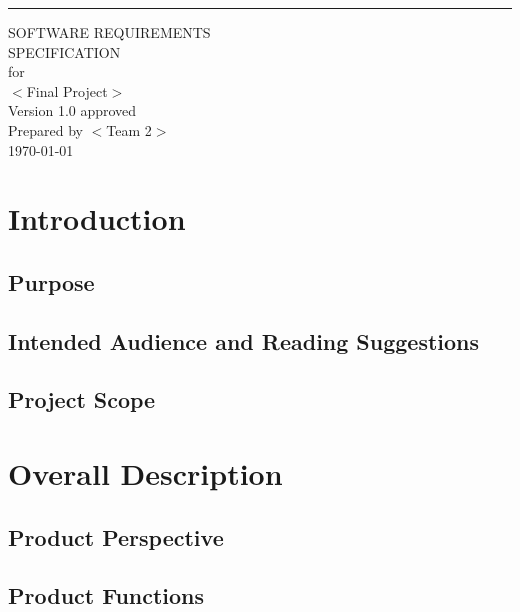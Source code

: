 \documentclass{scrreprt}
\date{}
\def\myversion{1.0 }
\begin{document}
\begin{flushright}
    \rule{16cm}{5pt}\vskip1cm
    \begin{bfseries}
        \Huge{SOFTWARE REQUIREMENTS\\ SPECIFICATION}\\
        \vspace{1.9cm}
        for\\
        \vspace{1.9cm}
        $<$Final Project$>$\\
        \vspace{1.9cm}
        \LARGE{Version \myversion approved}\\
        \vspace{1.9cm}
        Prepared by $<$Team 2$>$\\
        \vspace{1.9cm}
        \today\\
    \end{bfseries}
\end{flushright}

\tableofcontents

\chapter{Introduction}

\section{Purpose}

\section{Intended Audience and Reading Suggestions}

\section{Project Scope}


\chapter{Overall Description}

\section{Product Perspective}

\section{Product Functions}
\end{document}
